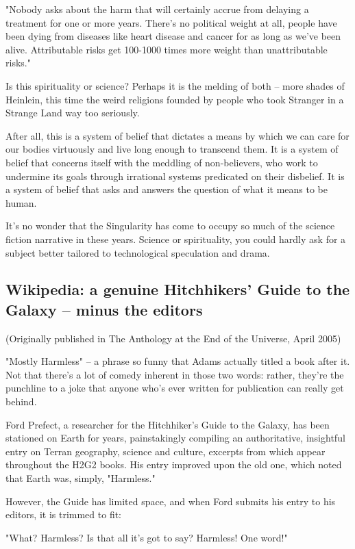 "Nobody asks about the harm that will certainly accrue from
delaying a treatment for one or more years. There's no political
weight at all, people have been dying from diseases like heart
disease and cancer for as long as we've been alive. Attributable
risks get 100-1000 times more weight than unattributable risks."

Is this spirituality or science? Perhaps it is the melding of both
-- more shades of Heinlein, this time the weird religions founded
by people who took Stranger in a Strange Land way too seriously.

After all, this is a system of belief that dictates a means by
which we can care for our bodies virtuously and live long enough to
transcend them. It is a system of belief that concerns itself with
the meddling of non-believers, who work to undermine its goals
through irrational systems predicated on their disbelief. It is a
system of belief that asks and answers the question of what it
means to be human.

It's no wonder that the Singularity has come to occupy so much of
the science fiction narrative in these years. Science or
spirituality, you could hardly ask for a subject better tailored to
technological speculation and drama.

\subsection{Wikipedia: a genuine Hitchhikers' Guide to the Galaxy -- minus the editors}

(Originally published in The Anthology at the End of the Universe,
April 2005)

"Mostly Harmless" -- a phrase so funny that Adams actually titled a
book after it. Not that there's a lot of comedy inherent in those
two words: rather, they're the punchline to a joke that anyone
who's ever written for publication can really get behind.

Ford Prefect, a researcher for the Hitchhiker's Guide to the
Galaxy, has been stationed on Earth for years, painstakingly
compiling an authoritative, insightful entry on Terran geography,
science and culture, excerpts from which appear throughout the H2G2
books. His entry improved upon the old one, which noted that Earth
was, simply, "Harmless."

However, the Guide has limited space, and when Ford submits his
entry to his editors, it is trimmed to fit:

"What? Harmless? Is that all it's got to say? Harmless! One word!"

